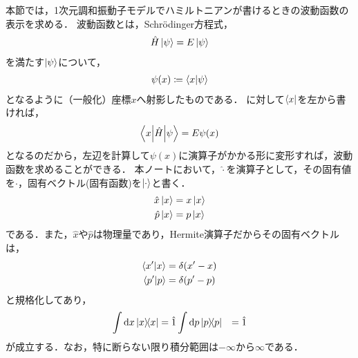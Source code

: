 \documentclass{report}
\begin{document}
  本節では，1次元調和振動子モデルでハミルトニアンが書けるときの波動函数の表示を求める．
  波動函数とは，Schr\"odinger方程式，
  \begin{align}
    \hat{H}\ket{\psi} = E\ket{\psi}\label{schrodinger-equation}
  \end{align}
  を満たす$\ket{\psi}$について，
  \begin{align}
    \psi(x) \coloneqq \braket{x}{\psi}
  \end{align}
  となるように（一般化）座標$x$へ射影したものである．
  に対して$\bra{x}$を左から書ければ，
  \begin{align}
    \mel**{x}{\hat{H}}{\psi} = E\psi(x)\label{bra-x-from-left}
  \end{align}
  となるのだから，左辺を計算して$\psi(x)$に演算子がかかる形に変形すれば，波動函数を求めることができる．
  本ノートにおいて，$\hat{\cdot}$を演算子として，その固有値を$\cdot$，固有ベクトル(固有函数)を$\ket{\cdot}$と書く．
  \begin{align}
    \hat{x}\ket{x} &= x\ket{x} \\ 
    \hat{p}\ket{x} &= p\ket{x}
  \end{align}
  である．また，$\hat{x}$や$\hat{p}$は物理量であり，Hermite演算子だからその固有ベクトルは，
  \begin{align}
    \braket{x'}{x} &= \delta\qty(x' - x) \\ 
    \braket{p'}{p} &= \delta\qty(p' - p)
  \end{align}
  と規格化してあり，
  \begin{align}
    \int\dd{x}\ketbra{x}{x} &= \hat{1}
    \int\dd{p}\ketbra{p}{p} &= \hat{1}
  \end{align}
  が成立する．なお，特に断らない限り積分範囲は$-\infty$から$\infty$である．
\end{document}

